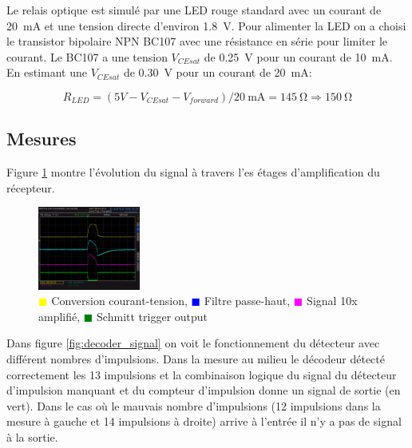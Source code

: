 \documentclass[french]{layout/Report}
\begin{document}
\begin{description}[leftmargin=!,labelwidth=4cm, labelindent=\parindent]
	\item[Relais] Le relais optique est simulé par une LED rouge standard avec un courant de \SI{20}{\milli\ampere} et une tension directe d'environ \SI{1.8}{\volt}. Pour alimenter la LED on a choisi le transistor bipolaire NPN BC107 avec une résistance en série pour limiter le courant.
		Le BC107 a une tension \(V_{CEsat}\) de \SI{0.25}{\volt} pour un courant de \SI{10}{\milli\ampere}.
		En estimant une \(V_{CEsat}\) de \SI{0.30}{\volt} pour un courant de \SI{20}{\milli\ampere}:

    \begin{equation*}
    R_{LED} = (5V - V_{CEsat} - V_{forward})/\SI{20}{\milli\ampere} = \SI{145}{\ohm} \Rightarrow \SI{150}{\ohm}
    \end{equation*}


\end{description}
\subsection{Mesures}

Figure \ref{fig:filter_signal} montre l'évolution du signal à travers l'es étages d'amplification du récepteur.

\begin{figure}[H]
\centering
\includegraphics[width=0.3\textwidth]{../measurements/SCR03}
\caption{
\textcolor{yellow}{$\blacksquare$} Conversion courant-tension,
\textcolor{blue}{$\blacksquare$} Filtre passe-haut,
\textcolor{magenta}{$\blacksquare$} Signal 10x amplifié,
\textcolor{green}{$\blacksquare$} Schmitt trigger output
}
\label{fig:filter_signal}
\end{figure}


Dans figure \ref{fig:decoder_signal} on voit le fonctionnement du détecteur avec différent nombres d'impulsions.
Dans la mesure au milieu le décodeur détecté correctement les 13 impulsions et la combinaison logique
du signal du détecteur d'impulsion manquant et du compteur d'impulsion donne un signal de sortie (en vert).
Dans le cas où le mauvais nombre  d'impulsions (12 impulsions dans la mesure à gauche et 14 impulsions à droite)
arrive à l'entrée il n'y a pas de signal à la sortie.
\end{document}
